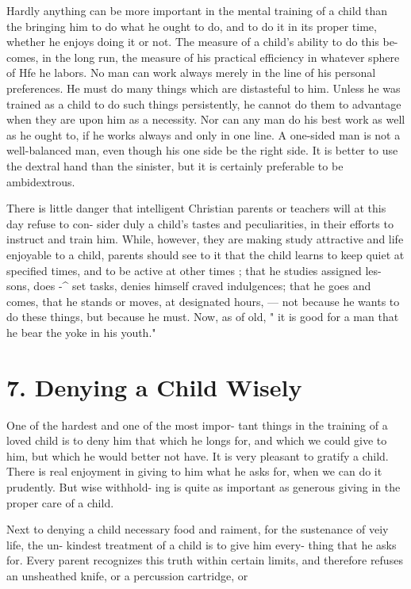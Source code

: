 \documentclass[
]{book}
\begin{document}
Hardly anything can be more important in the mental training of a child than the bringing him to do what he ought to do, and to do it in its proper time, whether he enjoys doing it or not. The measure of a child's ability to do this be- comes, in the long run, the measure of his practical efficiency in whatever sphere of Hfe he labors. No man can work always merely in the line of his personal preferences. He must do many things which are distasteful to him. Unless he was trained as a child to do such things persistently, he cannot do them to advantage when they are upon him as a necessity. Nor can any man do his best work as well as he ought to, if he works always and only in one line. A one-sided man is not a well-balanced man, even though his one side be the right side. It is better to use the dextral hand than the sinister, but it is certainly preferable to be ambidextrous.

There is little danger that intelligent Christian parents or teachers will at this day refuse to con- sider duly a child's tastes and peculiarities, in their efforts to instruct and train him. While, however, they are making study attractive and life enjoyable to a child, parents should see to it that the child learns to keep quiet at specified times, and to be active at other times ; that he studies assigned les- sons, does -\^{} set tasks, denies himself craved indulgences; that he goes and comes, that he stands or moves, at designated hours, --- not because he wants to do these things, but because he must. Now, as of old, " it is good for a man that he bear the yoke in his youth."

\hypertarget{denying-a-child-wisely}{%
\chapter{7. Denying a Child Wisely}\label{denying-a-child-wisely}}

One of the hardest and one of the most impor- tant things in the training of a loved child is to deny him that which he longs for, and which we could give to him, but which he would better not have. It is very pleasant to gratify a child. There is real enjoyment in giving to him what he asks for, when we can do it prudently. But wise withhold- ing is quite as important as generous giving in the proper care of a child.

Next to denying a child necessary food and raiment, for the sustenance of veiy life, the un- kindest treatment of a child is to give him every- thing that he asks for. Every parent recognizes this truth within certain limits, and therefore refuses an unsheathed knife, or a percussion cartridge, or
\end{document}
